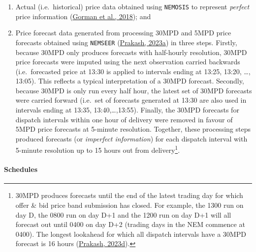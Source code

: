 \documentclass[12pt,a4paper,]{report}
\providecommand{\tightlist}{%
  \setlength{\itemsep}{0pt}\setlength{\parskip}{0pt}}
\begin{document}
\begin{enumerate}
\def\labelenumi{\arabic{enumi}.}
\tightlist
\item
  Actual (i.e.~historical) price data obtained using \texttt{NEMOSIS} to
  represent \emph{perfect} price information
  (\protect\hyperlink{ref-gormanNEMOSISNEMOpen2018}{Gorman et al.,
  2018}); and
\item
  Price forecast data generated from processing 30MPD and 5MPD price
  forecasts obtained using \texttt{NEMSEER}
  (\protect\hyperlink{ref-prakashNEMSEER2023}{Prakash, 2023a}) in three
  steps. Firstly, because 30MPD only produces forecasts with half-hourly
  resolution, 30MPD price forecasts were imputed using the next
  observation carried backwards (i.e.~forecasted price at 13:30 is
  applied to intervals ending at 13:25, 13:20, \ldots, 13:05). This
  reflects a typical interpretation of a 30MPD forecast. Secondly,
  because 30MPD is only run every half hour, the latest set of 30MPD
  forecasts were carried forward (i.e.~set of forecasts generated at
  13:30 are also used in intervals ending at 13:35, 13:40,\ldots,13:55).
  Finally, the 30MPD forecasts for dispatch intervals within one hour of
  delivery were removed in favour of 5MPD price forecasts at 5-minute
  resolution. Together, these processing steps produced forecasts (or
  \emph{imperfect information}) for each dispatch interval with 5-minute
  resolution up to 15 hours out from delivery\footnote{30MPD produces
    forecasts until the end of the latest trading day for which offer \&
    bid price band submission has closed. For example, the 1300 run on
    day D, the 0800 run on day D+1 and the 1200 run on day D+1 will all
    forecast out until 0400 on day D+2 (trading days in the NEM commence
    at 0400). The longest lookahead for which all dispatch intervals
    have a 30MPD forecast is 16 hours
    (\protect\hyperlink{ref-prakashLookingPredispatchDemand2023}{Prakash,
    2023d}).}.
\end{enumerate}

\hypertarget{schedules}{%
\paragraph{Schedules}\label{schedules}}
\end{document}
